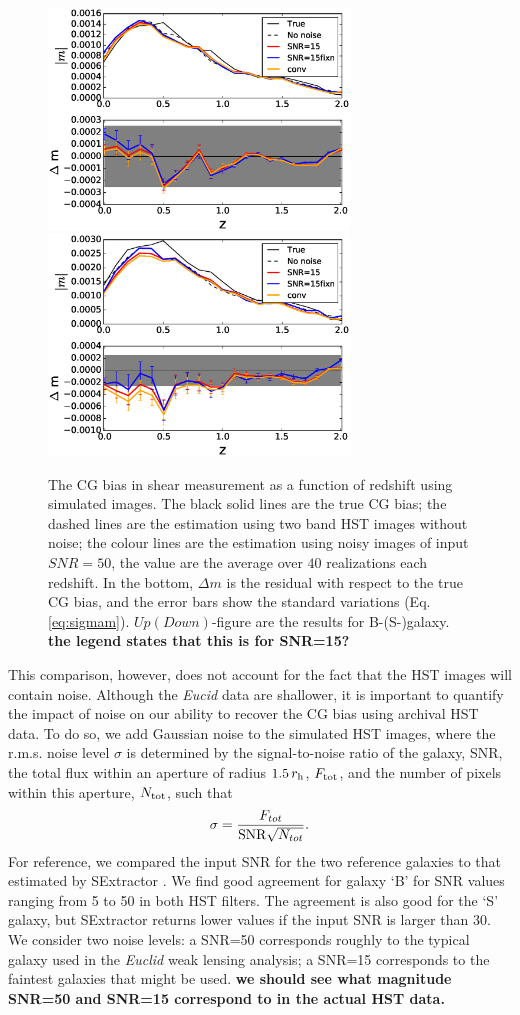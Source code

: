 \documentclass[useAMS,usenatbib]{mnras}
\newcommand{\be}{\begin{equation}}
\newcommand{\ee}{\end{equation}}
\begin{document}
\begin{figure}
  \includegraphics[width=8.0cm]{zs2n_b_snrtt50.eps}
  \includegraphics[width=8.0cm]{zs2n_s_snrtt50.eps}
\caption{The CG bias in shear measurement as a function of redshift
  using simulated images. The black solid lines are the true CG bias;
  the dashed lines are the estimation using two band HST images
  without noise; the colour lines are the estimation using noisy
  images of input $SNR=50$, the value are the average over $40$
  realizations each redshift. In the bottom, $\Delta m$ is the
  residual with respect to the true CG bias, and the error bars show
  the standard variations (Eq.\ref{eq:sigmam}). $Up(Down)$-figure are
  the results for B-(S-)galaxy. {\bf the legend states that this is for SNR=15?}}
\label{fig:biasofz50}
\end{figure}

This comparison, however, does not account for the fact that the HST images
will contain noise. Although the {\it Eucid} data are shallower, it is important to
quantify the impact of noise on our ability to recover the CG bias using archival
HST data. To do so, we add Gaussian noise to the simulated HST images, where
the r.m.s. noise level $\sigma$ is determined by the signal-to-noise ratio of the galaxy,
SNR, the total flux within an aperture of radius $1.5\,r_{\rm h}$, $F_{\rm tot}$,
and the number of pixels within this aperture, $N_{\rm tot}$, such that
%
\be
\sigma = {F_{tot} \over {\rm SNR} \sqrt{N_{tot}} }.
\ee
%
For reference, we compared the input SNR for the two reference galaxies
to that estimated by {\sc SExtractor} \citep{1996A&AS..117..393B}.
We find good agreement for galaxy `B' for SNR values ranging from 5 to 50
in both HST filters. The agreement is also good for the `S' galaxy, but 
{\textsc SExtractor} returns lower values if the input SNR is larger than 30.
We consider two noise levels: a SNR=50 corresponds roughly to the typical
galaxy used in the {\it Euclid} weak lensing analysis; a SNR=15 corresponds
to the faintest galaxies that might be used. {\bf we should see
what magnitude SNR=50 and SNR=15 correspond to in the actual HST data.}
\end{document}
